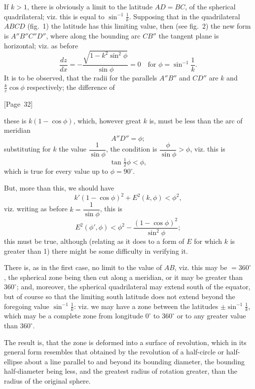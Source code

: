 \documentclass[11pt,a4paper]{article}
\theoremstyle{plain}
\theoremstyle{definition}
\theoremstyle{remark}
\begin{document}
If $k > 1$, there is obviously a limit to the latitude
$AD = BC$, of the spherical quadrilateral; viz. this is equal to
$\sin^{-1}\tfrac{1}{k}$.
Supposing that in the quadrilateral $ABCD$ (fig.~1) the latitude has
this limiting value, then (see fig.~2) the new form is $A''B''C''D''$,
where along the bounding arc $C B''$ the tangent plane is horizontal;
viz. as before
\[
\frac{dz}{dx} = -\frac{\sqrt{1-k^2\sin^2\phi}}{\sin\phi} = 0
\quad \text{for } \phi = \sin^{-1}\frac{1}{k}.
\]
It is to be observed, that the radii for the parallels $A''B''$ and
$C D''$ are $k$ and $\tfrac{k}{c}\cos\phi$ respectively; the difference of

\begin{center}
[Page~32]
\end{center}

these is $k(1-\cos\phi)$, which, however great $k$ is, must be less than
the arc of meridian
\[
A''D'' = \phi;
\]
substituting for $k$ the value $\dfrac{1}{\sin\phi}$, the condition is
$\dfrac{\phi}{\sin\phi} > \phi$, viz. this is
\[
\tan\tfrac{1}{2}\phi < \phi,
\]
which is true for every value up to $\phi = 90^\circ$.

But, more than this, we should have
\[
k'(1-\cos\phi)^2 + E^2(k,\phi) < \phi^2,
\]
viz. writing as before $k = \dfrac{1}{\sin\phi}$, this is
\[
E^2(\phi', \phi) < \phi^2 - \frac{(1-\cos\phi)^2}{\sin^2\phi};
\]
this must be true, although (relating as it does to a form of $E$ for
which $k$ is greater than 1) there might be some difficulty in verifying it.

There is, as in the first case, no limit to the value of $AB$,
viz. this may be $= 360^\circ$, the spherical zone being then cut along a
meridian, or it may be greater than $360^\circ$; and, moreover, the spherical
quadrilateral may extend south of the equator, but of course so that the
limiting south latitude does not extend beyond the foregoing value
$\sin^{-1}\tfrac{1}{k}$:
viz. we may have a zone between the latitudes
$\pm \sin^{-1}\tfrac{1}{k}$, which may be a complete zone from longitude
$0^\circ$ to $360^\circ$ or to any greater value than $360^\circ$.

The result is, that the zone is deformed into a surface of revolution,
which in its general form resembles that obtained by the revolution of a
half-circle or half-ellipse about a line parallel to and beyond its
bounding diameter, the bounding half-diameter being less, and the
greatest radius of rotation greater, than the radius of the original sphere.


\newpage
\end{document}
